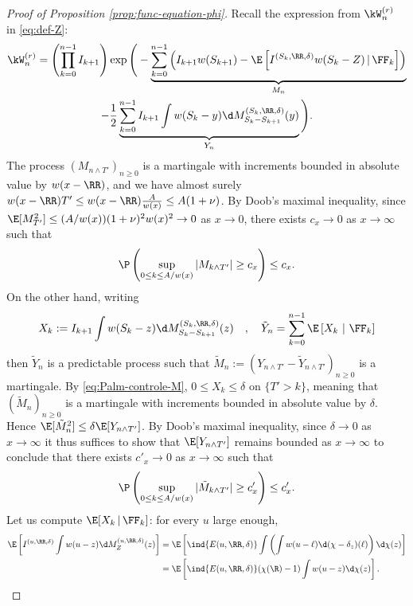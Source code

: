 \documentclass[10pt,a4paper]{article}
\begin{document}
\begin{proof}[Proof of Proposition \ref{prop:func-equation-phi}]
Recall the expression from $\kW^{(r)}_n$ in \eqref{eq:def-Z}: 
\begin{multline*}
\kW^{(r)}_n = \left(\prod_{k=0}^{n-1} I_{k+1} \right) \exp\Bigg( - \underbrace{\sum_{k=0}^{n-1} \left( I_{k+1} w(S_{k+1}) - \E\left[I^{(S_k, \RR, \delta)} w(S_k - Z) \, | \, \FF_k\right] \right)}_{M_n} \\
-\frac{1}{2} \underbrace{ \sum_{k=0}^{n-1} I_{k+1} \int w(S_{k}-y) \d M_{S_k - S_{k+1}}^{(S_k, \RR, \delta)}(y)}_{Y_n} \Bigg) . 
\end{multline*}
The process $(M_{n\wedge T'})_{n\geq 0}$ is a martingale with increments bounded in absolute value by $w(x-\RR)$, and we have almost surely $w(x-\RR) T' \leq w(x-\RR) \frac{A}{w(x)} \leq A(1+\nu)$. By Doob's maximal inequality, since $\E[M_{T'}^2] \leq (A/w(x)) (1+\nu)^2 w(x)^2 \to 0$ as $x\to 0$, there exists $c_x\to 0$ as $x\to\infty$ such that 
\begin{equation}\label{eq:controle-Z-1}
\P\left( \sup_{0\leq k \leq A/w(x)} |M_{k\wedge T'}| \geq c_x \right) \leq c_x .
\end{equation}
On the other hand, writing 
\[ X_k := I_{k+1} \int w(S_{k}-z) \d M_{S_{k}-S_{k+1}}^{(S_k, \RR, \delta)}(z) \quad , \quad \tilde Y_n = \sum_{k=0}^{n-1} \E\left[ X_k \ | \ \FF_k \right] \]
then $\tilde Y_n$ is a predictable process such that $\tilde M_n := (Y_{n\wedge T'} - \tilde Y_{n\wedge T'})_{n\geq 0}$ is a martingale. By \eqref{eq:Palm-controle-M}, $0\leq X_k \leq \delta$ on $\{T'>k\}$, meaning that $(\tilde M_n)_{n\geq 0}$ is a martingale with increments bounded in absolute value by $\delta$. Hence $\E[\tilde M_n^2] \leq \delta \E[Y_{n\wedge T'}]$. By Doob's maximal inequality, since $\delta\to 0$ as $x\to\infty$ it thus suffices to show that $\E[Y_{n\wedge T'}]$ remains bounded as $x\to\infty$ to conclude that there exists $c'_x\to 0$ as $x\to\infty$ such that 
\begin{equation}\label{eq:controle-Z-2}
\P\left( \sup_{0\leq k \leq A/w(x)} |\tilde M_{k\wedge T'}| \geq c'_x \right) \leq c'_x .
\end{equation}
%
Let us compute $\E[X_k \, | \, \FF_{k}]$: for every $u$ large enough, 
\begin{align*}
\E\left[ I^{(u,\RR,\delta)} \int w(u-z) \d M_{Z}^{(u, \RR, \delta)}(z) \right] &= \E\left[ \ind{E(u,\RR,\delta)} \int \left(\int w(u-\ell) \d(\chi-\delta_z)(\ell)\right) \d\chi(z) \right] \\
&= \E\left[ \ind{E(u,\RR,\delta)} (\chi(\R)-1)\int w(u-z)\d\chi(z) \right] .
\end{align*}

\end{proof}
\end{document}
